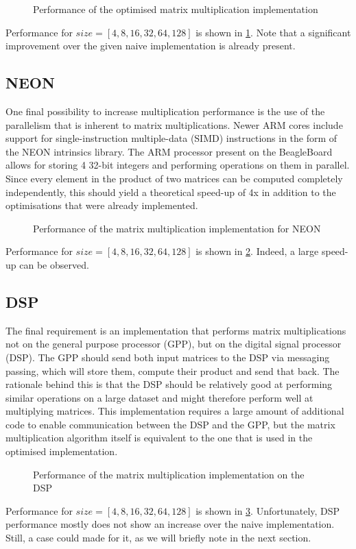 \documentclass[final]{article}
\begin{document}
\begin{figure}[H]
	\centering
	
	\caption{Performance of the optimised matrix multiplication implementation}
	\label{fig:optimised}
\end{figure}

Performance for $size = [4, 8, 16, 32, 64, 128]$ is shown in \cref{fig:optimised}.
Note that a significant improvement over the given naive implementation is already present.

\subsection{NEON}
One final possibility to increase multiplication performance is the use of the parallelism that is inherent to matrix multiplications.
Newer ARM cores include support for single-instruction multiple-data (SIMD) instructions in the form of the NEON intrinsics library.
The ARM processor present on the BeagleBoard allows for storing 4 32-bit integers and performing operations on them in parallel.
Since every element in the product of two matrices can be computed completely independently, this should yield a theoretical speed-up of 4x in addition to the optimisations that were already implemented.

\begin{figure}[H]
	\centering
	
	\caption{Performance of the matrix multiplication implementation for NEON}
	\label{fig:neon}
\end{figure}

Performance for $size = [4, 8, 16, 32, 64, 128]$ is shown in \cref{fig:neon}.
Indeed, a large speed-up can be observed.

\subsection{DSP}
The final requirement is an implementation that performs matrix multiplications not on the general purpose processor (GPP), but on the digital signal processor (DSP).
The GPP should send both input matrices to the DSP via messaging passing, which will store them, compute their product and send that back.
The rationale behind this is that the DSP should be relatively good at performing similar operations on a large dataset and might therefore perform well at multiplying matrices.
This implementation requires a large amount of additional code to enable communication between the DSP and the GPP, but the matrix multiplication algorithm itself is equivalent to the one that is used in the optimised implementation.

\begin{figure}[H]
	\centering
	
	\caption{Performance of the matrix multiplication implementation on the DSP}
	\label{fig:dsp}
\end{figure}

Performance for $size = [4, 8, 16, 32, 64, 128]$ is shown in \cref{fig:dsp}.
Unfortunately, DSP performance mostly does not show an increase over the naive implementation. Still, a case could made for it, as we will briefly note in the next section.
\end{document}
